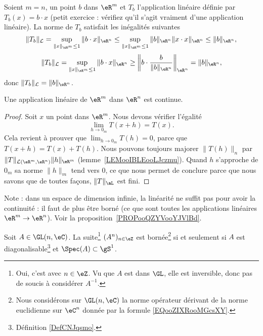 \begin{example}
	Soient \( m=n\), un point \( b\) dans \( \eR^m\) et \( T_b\) l'application linéaire définie par \( T_b(x)=b\cdot x\) (petit exercice : vérifiez qu'il s'agit vraiment d'une application linéaire).  La norme de \( T_b\) satisfait les inégalités suivantes
	\[
		\|T_b\|_{\mathcal{L}}=\sup_{\|x\|_{\eR^m}\leq 1}\|b\cdot x\|_{\eR^n}\leq \sup_{\|x\|_{\eR^m}\leq 1}\|b \|_{\eR^n}\|x\cdot x\|_{\eR^n}\leq\|b \|_{\eR^n},
	\]
	\[
		\|T_b\|_{\mathcal{L}}=\sup_{\|x\|_{\eR^m}\leq 1}\|b\cdot x\|_{\eR^n}\geq \left\|b\cdot \frac{b}{\|b \|_{\eR^n}}\right\|_{\eR^n}=\|b \|_{\eR^n},
	\]
	donc \( \|T_b\|_{\mathcal{L}}=\|b \|_{\eR^n}\).
\end{example}

\begin{proposition}
	Une application linéaire de \( \eR^m\) dans \( \eR^n\) est continue.
\end{proposition}

\begin{proof}
	Soit \( x\) un point dans \( \eR^m\). Nous devons vérifier l'égalité
	\begin{equation}
		\lim_{h\to 0_m}T(x+h)=T(x).
	\end{equation}
	Cela revient à prouver que \( \lim_{h\to 0_m}T(h)=0\), parce que \( T(x+h)=T(x)+T(h)\). Nous pouvons toujours majorer \( \|T(h)\|_n\) par \( \|T\|_{\mathcal{L}(\eR^m,\eR^n)}\| h \|_{\eR^m}\) (lemme~\ref{LEMooIBLEooLJczmu}). Quand \( h\) s'approche de \(  0_m \) sa norme \( \|h\|_m\) tend vers \( 0\), ce que nous permet de conclure parce que nous savons que de toutes façons, \( \| T \|_{\aL}\) est fini.
\end{proof}

Note : dans un espace de dimension infinie, la linéarité ne suffit pas pour avoir la continuité : il faut de plus être borné (ce que sont toutes les applications linéaires \( \eR^m\to\eR^n\)). Voir la proposition~\ref{PROPooQZYVooYJVlBd}.

\begin{proposition}            \label{PROPooHXJAooGaDtme}
	Soit \( A\in\GL(n,\eC)\). La suite\footnote{Oui, c'est avec \( n\in \eZ\). Vu que \( A\) est dans \( \GL\), elle est inversible, donc pas de soucis à considérer \( A^{-1}\).} \( (A^n)_{n\in \eZ}\) est bornée\footnote{Nous considérons sur \( \GL(n,\eC)\) la norme opérateur dérivant de la norme euclidienne sur \( \eC^n\) donnée par la formule \eqref{EQooZIXRooMGcsXY}.} si et seulement si \( A\) est diagonalisable\footnote{Définition \ref{DefCNJqsmo}.} et \( \Spec(A)\subset \gS^1\).
\end{proposition}

